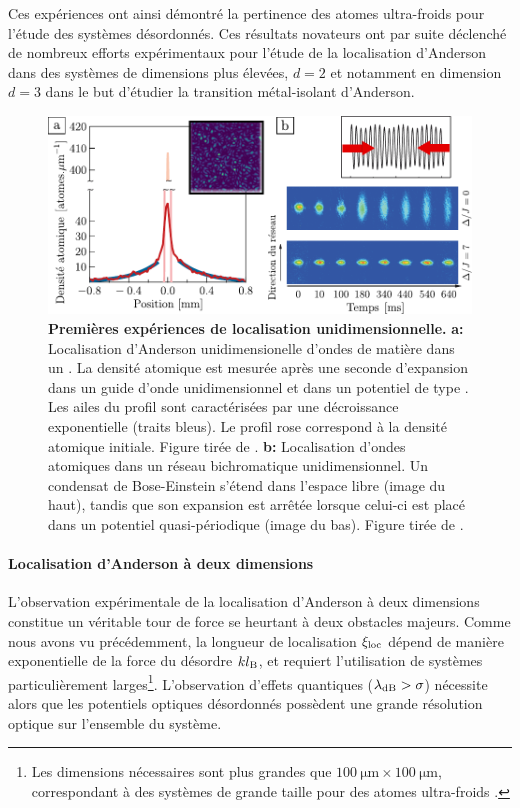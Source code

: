Ces expériences ont ainsi démontré la pertinence des atomes ultra-froids pour l'étude des systèmes désordonnés. Ces résultats novateurs ont par suite déclenché de nombreux efforts expérimentaux pour l'étude de la localisation d'Anderson dans des systèmes de dimensions plus élevées, $d=2$ et notamment en dimension $d=3$ dans le but d'étudier la transition métal-isolant d'Anderson. 

\begin{figure}
\centering
\includegraphics[width=\textwidth]{Fig/Localisation/localisation_1D_atomes.pdf}
\caption{\textbf{Premières expériences de localisation unidimensionnelle.} \textbf{a:} Localisation d'Anderson unidimensionelle d'ondes de matière dans un \speckle . La densité atomique est mesurée après une seconde d'expansion dans un guide d'onde unidimensionnel et dans un potentiel de type \speckle . Les ailes du profil sont caractérisées par une décroissance exponentielle (traits bleus). Le profil rose correspond à la densité atomique initiale. Figure tirée de \citep{billy2008direct}. \textbf{b:} Localisation d'ondes atomiques dans un réseau bichromatique unidimensionnel. Un condensat de Bose-Einstein s'étend dans l'espace libre (image du haut), tandis que son expansion est arrêtée lorsque celui-ci est placé dans un potentiel quasi-périodique (image du bas). Figure tirée de \citep{roati2008anderson}. }
\label{fig:localisation_1D_atomes_froids}
\end{figure}

\paragraph*{Localisation d'Anderson à deux dimensions}
L'observation expérimentale de la localisation d'Anderson à deux dimensions constitue un véritable tour de force se heurtant à deux obstacles majeurs. Comme nous avons vu précédemment, la longueur de localisation $\xi_{\mathrm{loc}}$ dépend de manière exponentielle de la force du désordre $kl_{\mathrm{B}}$, et requiert l'utilisation de systèmes particulièrement larges\footnote{Les dimensions nécessaires sont plus grandes que $\SI{100}{\micro\metre}\times\SI{100}{\micro\metre}$, correspondant à des systèmes de grande taille pour des atomes ultra-froids \citep{white2020observation}.}. L'observation d'effets quantiques ($\lambda_{\mathrm{dB}}>\sigma$) nécessite alors que les potentiels optiques désordonnés possèdent une grande résolution optique sur l'ensemble du système.

